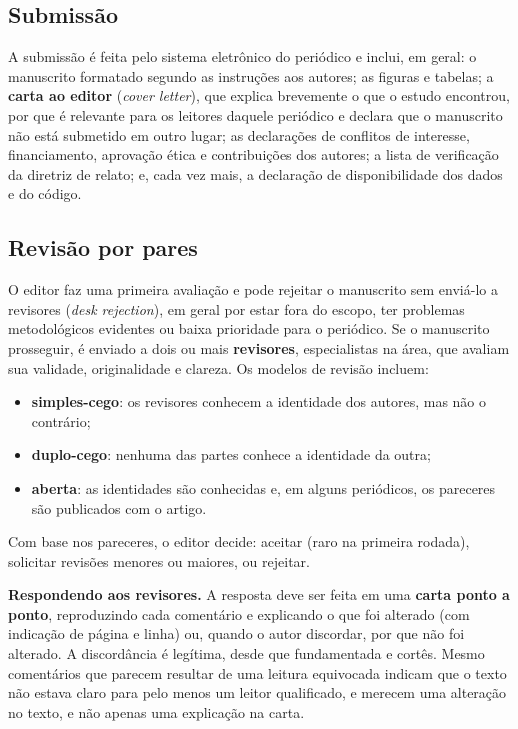 \documentclass[
]{book}
\providecommand{\tightlist}{%
  \setlength{\itemsep}{0pt}\setlength{\parskip}{0pt}}
\begin{document}
\subsection{Submissão}\label{submissuxe3o}

A submissão é feita pelo sistema eletrônico do periódico e inclui, em geral: o manuscrito formatado segundo as instruções aos autores; as figuras e tabelas; a \textbf{carta ao editor} (\emph{cover letter}), que explica brevemente o que o estudo encontrou, por que é relevante para os leitores daquele periódico e declara que o manuscrito não está submetido em outro lugar; as declarações de conflitos de interesse, financiamento, aprovação ética e contribuições dos autores; a lista de verificação da diretriz de relato; e, cada vez mais, a declaração de disponibilidade dos dados e do código.

\subsection{Revisão por pares}\label{revisuxe3o-por-pares}

O editor faz uma primeira avaliação e pode rejeitar o manuscrito sem enviá-lo a revisores (\emph{desk rejection}), em geral por estar fora do escopo, ter problemas metodológicos evidentes ou baixa prioridade para o periódico. Se o manuscrito prosseguir, é enviado a dois ou mais \textbf{revisores}, especialistas na área, que avaliam sua validade, originalidade e clareza. Os modelos de revisão incluem:

\begin{itemize}
\tightlist
\item
  \textbf{simples-cego}: os revisores conhecem a identidade dos autores, mas não o contrário;
\item
  \textbf{duplo-cego}: nenhuma das partes conhece a identidade da outra;
\item
  \textbf{aberta}: as identidades são conhecidas e, em alguns periódicos, os pareceres são publicados com o artigo.
\end{itemize}

Com base nos pareceres, o editor decide: aceitar (raro na primeira rodada), solicitar revisões menores ou maiores, ou rejeitar.

\textbf{Respondendo aos revisores.} A resposta deve ser feita em uma \textbf{carta ponto a ponto}, reproduzindo cada comentário e explicando o que foi alterado (com indicação de página e linha) ou, quando o autor discordar, por que não foi alterado. A discordância é legítima, desde que fundamentada e cortês. Mesmo comentários que parecem resultar de uma leitura equivocada indicam que o texto não estava claro para pelo menos um leitor qualificado, e merecem uma alteração no texto, e não apenas uma explicação na carta.
\end{document}
